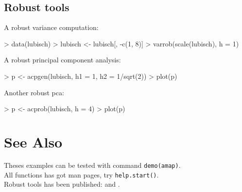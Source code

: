 \documentclass[a4paper]{article}
\begin{document}
\subsection{Robust tools}

A robust variance computation:
\begin{Schunk}
\begin{Sinput}
> data(lubisch)
> lubisch <- lubisch[, -c(1, 8)]
> varrob(scale(lubisch), h = 1)
\end{Sinput}
\end{Schunk}
A robust principal component analysis:
\begin{Schunk}
\begin{Sinput}
> p <- acpgen(lubisch, h1 = 1, h2 = 1/sqrt(2))
> plot(p)
\end{Sinput}
\end{Schunk}
Another robust pca:
\begin{Schunk}
\begin{Sinput}
> p <- acprob(lubisch, h = 4)
> plot(p)
\end{Sinput}
\end{Schunk}


\section{See Also}

Theses examples can be tested with command
{\tt demo(amap)}.\\

\noindent
All functions has got man pages, try 
{\tt help.start()}.\\

\noindent
Robust tools has been published: \cite{caussinu+ruiz} and
\cite{caussinu+ruiz2}.




\end{document}
